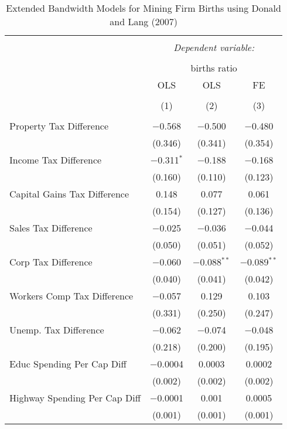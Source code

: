 
\begin{table}[!htbp] \centering 
  \caption{Extended Bandwidth Models for  Mining Firm Births using Donald and Lang (2007)} 
  \label{} 
\begin{tabular}{@{\extracolsep{5pt}}lccc} 
\\[-1.8ex]\hline 
\hline \\[-1.8ex] 
 & \multicolumn{3}{c}{\textit{Dependent variable:}} \\ 
\cline{2-4} 
\\[-1.8ex] & \multicolumn{3}{c}{births ratio} \\ 
 & OLS & OLS & FE \\ 
\\[-1.8ex] & (1) & (2) & (3)\\ 
\hline \\[-1.8ex] 
 Property Tax Difference & $-$0.568 & $-$0.500 & $-$0.480 \\ 
  & (0.346) & (0.341) & (0.354) \\ 
  Income Tax Difference & $-$0.311$^{*}$ & $-$0.188 & $-$0.168 \\ 
  & (0.160) & (0.110) & (0.123) \\ 
  Capital Gains Tax Difference & 0.148 & 0.077 & 0.061 \\ 
  & (0.154) & (0.127) & (0.136) \\ 
  Sales Tax Difference & $-$0.025 & $-$0.036 & $-$0.044 \\ 
  & (0.050) & (0.051) & (0.052) \\ 
  Corp Tax Difference & $-$0.060 & $-$0.088$^{**}$ & $-$0.089$^{**}$ \\ 
  & (0.040) & (0.041) & (0.042) \\ 
  Workers Comp Tax Difference & $-$0.057 & 0.129 & 0.103 \\ 
  & (0.331) & (0.250) & (0.247) \\ 
  Unemp. Tax Difference & $-$0.062 & $-$0.074 & $-$0.048 \\ 
  & (0.218) & (0.200) & (0.195) \\ 
  Educ Spending Per Cap Diff & $-$0.0004 & 0.0003 & 0.0002 \\ 
  & (0.002) & (0.002) & (0.002) \\ 
  Highway Spending Per Cap Diff & $-$0.0001 & 0.001 & 0.0005 \\ 
  & (0.001) & (0.001) & (0.001) \\ 

\end{tabular}
\end{table}
